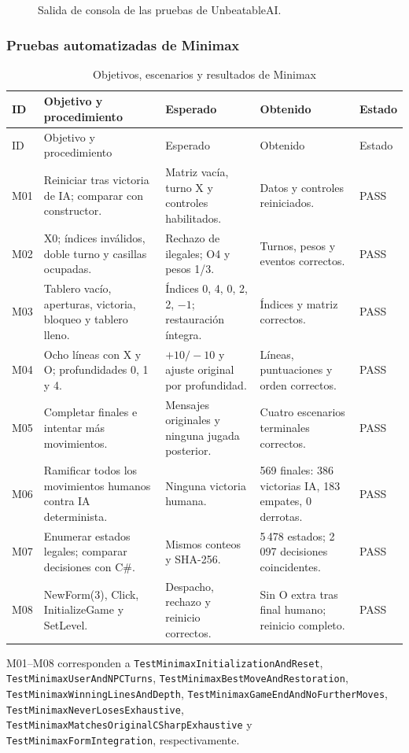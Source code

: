 \documentclass[12pt,a4paper]{article}
\begin{document}
\begin{figure}[H]

\caption{Salida de consola de las pruebas de UnbeatableAI.}
\label{fig:consola-unbeatable}
\end{figure}

\subsubsection{Pruebas automatizadas de Minimax}
\begin{longtable}{p{1cm}p{3.4cm}p{3.3cm}p{3.4cm}p{1.6cm}}
\caption{Objetivos, escenarios y resultados de Minimax}\\
\toprule ID & Objetivo y procedimiento & Esperado & Obtenido & Estado\\\midrule\endfirsthead
\toprule ID & Objetivo y procedimiento & Esperado & Obtenido & Estado\\\midrule\endhead
M01 & Reiniciar tras victoria de IA; comparar con constructor. & Matriz vacía, turno X y controles habilitados. & Datos y controles reiniciados. & PASS\\
M02 & X0; índices inválidos, doble turno y casillas ocupadas. & Rechazo de ilegales; O4 y pesos 1/3. & Turnos, pesos y eventos correctos. & PASS\\
M03 & Tablero vacío, aperturas, victoria, bloqueo y tablero lleno. & Índices 0, 4, 0, 2, 2, $-1$; restauración íntegra. & Índices y matriz correctos. & PASS\\
M04 & Ocho líneas con X y O; profundidades 0, 1 y 4. & $+10/-10$ y ajuste original por profundidad. & Líneas, puntuaciones y orden correctos. & PASS\\
M05 & Completar finales e intentar más movimientos. & Mensajes originales y ninguna jugada posterior. & Cuatro escenarios terminales correctos. & PASS\\
M06 & Ramificar todos los movimientos humanos contra IA determinista. & Ninguna victoria humana. & 569 finales: 386 victorias IA, 183 empates, 0 derrotas. & PASS\\
M07 & Enumerar estados legales; comparar decisiones con C\#. & Mismos conteos y SHA-256. & 5\,478 estados; 2\,097 decisiones coincidentes. & PASS\\
M08 & NewForm(3), Click, InitializeGame y SetLevel. & Despacho, rechazo y reinicio correctos. & Sin O extra tras final humano; reinicio completo. & PASS\\
\bottomrule
\end{longtable}
M01--M08 corresponden a \texttt{TestMinimaxInitializationAndReset},
\texttt{TestMinimaxUserAndNPCTurns}, \texttt{TestMinimaxBestMoveAndRestoration},
\texttt{TestMinimaxWinningLinesAndDepth}, \texttt{TestMinimaxGameEndAndNoFurtherMoves},
\texttt{TestMinimaxNeverLosesExhaustive}, \texttt{TestMinimaxMatchesOriginalCSharpExhaustive}
y \texttt{TestMinimaxFormIntegration}, respectivamente.
\end{document}
